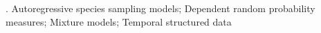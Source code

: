 \documentclass[12pt]{article}
\begin{document}
\vskip 2mm

.
Autoregressive species sampling models; Dependent random probability measures; Mixture models; Temporal structured data


%        
%
%        

%
%
%
%
%
%
\end{document}
